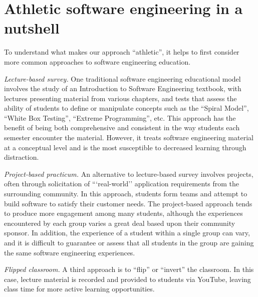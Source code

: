 \section{Athletic software engineering in a nutshell}

To understand what makes our approach ``athletic'', it helps to first consider more common approaches to software engineering education. 

{\em Lecture-based survey.}  One traditional software engineering educational model involves the study of an Introduction to Software Engineering textbook, with lectures presenting material from various chapters, and tests that assess the ability of students to define or manipulate concepts such as the ``Spiral Model'', ``White Box Testing'', ``Extreme Programming'', etc. This approach has the benefit of being both comprehensive and consistent in the way students each semester encounter the material. However, it treats software engineering material at a conceptual level and is the most susceptible to decreased learning through distraction.

{\em Project-based practicum.}  An alternative to lecture-based survey involves projects, often through solicitation of ```real-world'' application requirements from the surrounding community.  In this approach, students form teams and attempt to build software to satisfy their customer needs.  The project-based approach tends to produce more engagement among many students, although the experiences encountered by each group varies a great deal based upon their community sponsor. In addition, the experience of a student within a single group can vary, and it is difficult to guarantee or assess that all students in the group are gaining the same software engineering experiences. 

{\em Flipped classroom.}  A third approach is to ``flip'' or ``invert'' the classroom. In this case, lecture material is recorded and provided to students via YouTube, leaving class time for more active learning opportunities.  